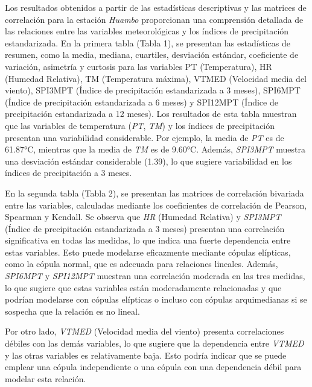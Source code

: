 \begin{figure}[htbp]
\end{figure}



Los resultados obtenidos a partir de las estadísticas descriptivas y las matrices de correlación para la estación \textit{Huambo} proporcionan una comprensión detallada de las relaciones entre las variables meteorológicas y los índices de precipitación estandarizada. En la primera tabla (Tabla 1), se presentan las estadísticas de resumen, como la media, mediana, cuartiles, desviación estándar, coeficiente de variación, asimetría y curtosis para las variables PT (Temperatura), HR (Humedad Relativa), TM (Temperatura máxima), VTMED (Velocidad media del viento), SPI3MPT (Índice de precipitación estandarizada a 3 meses), SPI6MPT (Índice de precipitación estandarizada a 6 meses) y SPI12MPT (Índice de precipitación estandarizada a 12 meses). Los resultados de esta tabla muestran que las variables de temperatura (\textit{PT}, \textit{TM}) y los índices de precipitación presentan una variabilidad considerable. Por ejemplo, la media de \textit{PT} es de 61.87°C, mientras que la media de \textit{TM} es de 9.60°C. Además, \textit{SPI3MPT} muestra una desviación estándar considerable (1.39), lo que sugiere variabilidad en los índices de precipitación a 3 meses.

En la segunda tabla (Tabla 2), se presentan las matrices de correlación bivariada entre las variables, calculadas mediante los coeficientes de correlación de Pearson, Spearman y Kendall. Se observa que \textit{HR} (Humedad Relativa) y \textit{SPI3MPT} (Índice de precipitación estandarizada a 3 meses) presentan una correlación significativa en todas las medidas, lo que indica una fuerte dependencia entre estas variables. Esto puede modelarse eficazmente mediante cópulas elípticas, como la cópula normal, que es adecuada para relaciones lineales. Además, \textit{SPI6MPT} y \textit{SPI12MPT} muestran una correlación moderada en las tres medidas, lo que sugiere que estas variables están moderadamente relacionadas y que podrían modelarse con cópulas elípticas o incluso con cópulas arquimedianas si se sospecha que la relación es no lineal.

Por otro lado, \textit{VTMED} (Velocidad media del viento) presenta correlaciones débiles con las demás variables, lo que sugiere que la dependencia entre \textit{VTMED} y las otras variables es relativamente baja. Esto podría indicar que se puede emplear una cópula independiente o una cópula con una dependencia débil para modelar esta relación.

